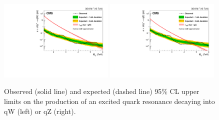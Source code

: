 \begin{figure}[ht!]
\centering
    \includegraphics[width=0.49\textwidth]{figures/analysis/search2/B2G-17-001/figures/brazilianFlag_qW_qVnew_new_combined_13TeV.pdf}
    \includegraphics[width=0.49\textwidth]{figures/analysis/search2/B2G-17-001/figures/brazilianFlag_qZ_qVnew_new_combined_13TeV.pdf}\\
\caption{Observed (solid line) and expected (dashed line) 95\% CL upper limits on the production of an excited quark resonance
decaying into qW (left) or qZ (right).}
\label{fig:searchII:limitCombined_qV}
\end{figure}


